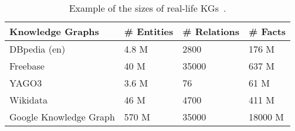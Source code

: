 \begin{table}[t]
\centering


\begin{tabular}{@{}llll@{}}
\toprule
Knowledge Graphs       & \# Entities & \# Relations & \# Facts \\ \midrule
DBpedia (en)%
					   &      4.8 M  &       2800       &   176 M       \\
Freebase			   &     40 M    &      35000   &    637 M \\
YAGO3%
 &      3.6 M   &       76   &   61 M  \\
Wikidata%
&      46 M   &       4700   &   411 M  \\
Google Knowledge Graph &      570 M  &       35000  &   18000 M\\ \bottomrule
\end{tabular}
\caption{Example of the sizes of real-life KGs~\cite{Nickel2015ARO,DBLP:journals/semweb/Paulheim17}.}
\label{tab:kgs}

\end{table}